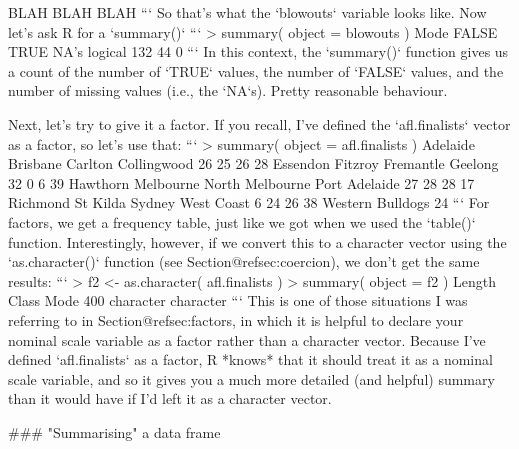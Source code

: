   BLAH BLAH BLAH
```
So that's what the `blowouts` variable looks like. Now let's ask R for a `summary()` 
```
> summary( object = blowouts )
   Mode   FALSE    TRUE    NA's 
logical     132      44       0 
```
In this context, the `summary()` function gives us a count of the number of `TRUE` values, the number of `FALSE` values, and the number of missing values (i.e., the `NA`s). Pretty reasonable behaviour. 

Next, let's try to give it a factor. If you recall, I've defined the `afl.finalists` vector as a factor, so let's use that:
```
> summary( object = afl.finalists )
        Adelaide         Brisbane          Carlton      Collingwood 
              26               25               26               28 
        Essendon          Fitzroy        Fremantle          Geelong 
              32                0                6               39 
        Hawthorn        Melbourne  North Melbourne    Port Adelaide 
              27               28               28               17 
        Richmond         St Kilda           Sydney       West Coast 
               6               24               26               38 
Western Bulldogs 
              24 
```
For factors, we get a frequency table, just like we got when we used the `table()` function. Interestingly, however, if we convert this to a character vector using the `as.character()` function (see Section@refsec:coercion), we don't get the same results:
```
> f2 <- as.character( afl.finalists )
> summary( object = f2 )
   Length     Class      Mode 
      400 character character 
```
This is one of those situations I was referring to in Section@refsec:factors, in which it is helpful to declare your nominal scale variable as a factor rather than a character vector. Because I've defined `afl.finalists` as a factor, R *knows* that it should treat it as a nominal scale variable, and so it gives you a much more detailed (and helpful) summary than it would have if I'd left it as a character vector.



### "Summarising" a data frame

